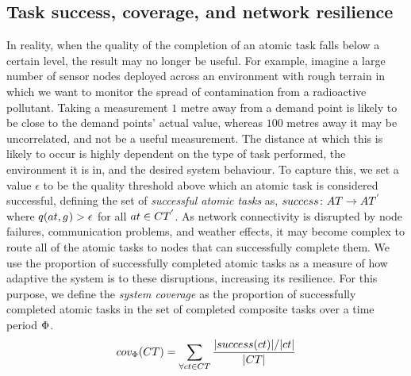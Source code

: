 \subsection{Task success, coverage, and network resilience}

\newcommand{\varQualityMin}[2]{\epsilon}
\newcommand{\formalTasksSuccess}[2]{
	\functionFormal{success}
	{\setAtomicTask{}{}}
	{\setAtomicTask{}{'}}
}
\newcommand{\functionTasksSuccess}[2]{
\ifx&#1&%
	\functionSignature{success}{\setAtomicTask{}{}}
\else
	\functionSignature{success}{#1}
\fi
}

\newcommand{\formalCompositeTaskCoverage}[2]{
	\functionFormal{taskcov}
	{\setCompositeTask{}{}}
	{\setCompositeTask{}{'}}
}
\newcommand{\functionCompositeTaskCoverage}[2]{
	\functionSignature{taskcov}{\setCompositeTask{}{}}
}


\newcommand{\functionSystemCoverage}[2]{
	\functionSignature{cov_{\setTime{}{}}}{\setCompositeTask{}{}}
}

In reality, when the quality of the completion of an atomic task falls below a certain level, the result may no longer be useful. For example, imagine a large number of sensor nodes deployed across an environment with rough terrain in which we want to monitor the spread of contamination from a radioactive pollutant. Taking a measurement $1$ metre away from a demand point is likely to be close to the demand points' actual value, whereas $100$ metres away it may be uncorrelated, and not be a useful measurement. The distance at which this is likely to occur is highly dependent on the type of task performed, the environment it is in, and the desired system behaviour. To capture this, we set a value $\varQualityMin{}{}$ to be the quality threshold above which an atomic task is considered successful, defining the set of \textit{successful atomic tasks} as, $\formalTasksSuccess{}{}$ where $\functionAtomicTaskQualitySignature{}{} > \varQualityMin{}{}$ for all $\varAtomicTask{}{} \in \setCompositeTask{}{'}$.  As network connectivity is disrupted by node failures, communication problems, and weather effects, it may become complex to route all of the atomic tasks to nodes that can successfully complete them. We use the proportion of successfully completed atomic tasks as a measure of how adaptive the system is to these disruptions, increasing its resilience.  For this purpose, we define the \textit{system coverage} as the proportion of successfully completed atomic tasks in the set of completed composite tasks over a time period $\Phi$.
\begin{equation}
	\label{eq:coverage}
	\functionSystemCoverage{}{} = \sum\limits_{\forall \varCompositeTask{}{} \in \setCompositeTask{}{}} 
	\frac
	{\funcSize{\functionTasksSuccess{\varCompositeTask{}{}}{}}/\funcSize{\varCompositeTask{}{}}}
	{\funcSize{\setCompositeTask{}{}}{}}
\end{equation}